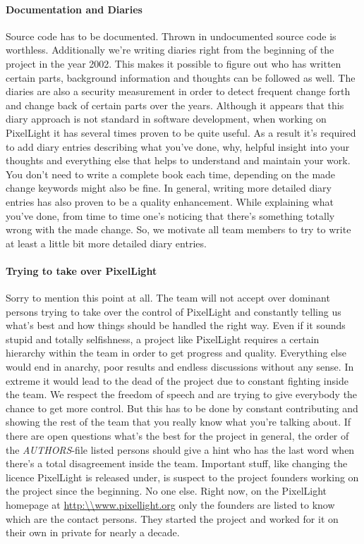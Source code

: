\paragraph{Documentation and Diaries}
Source code has to be documented. Thrown in undocumented source code is worthless. Additionally we're writing diaries right from the beginning of the project in the year 2002. This makes it possible to figure out who has written certain parts, background information and thoughts can be followed as well. The diaries are also a security measurement in order to detect frequent change forth and change back of certain parts over the years. Although it appears that this diary approach is not standard in software development, when working on PixelLight it has several times proven to be quite useful. As a result it's required to add diary entries describing what you've done, why, helpful insight into your thoughts and everything else that helps to understand and maintain your work. You don't need to write a complete book each time, depending on the made change keywords might also be fine. In general, writing more detailed diary entries has also proven to be a quality enhancement. While explaining what you've done, from time to time one's noticing that there's something totally wrong with the made change. So, we motivate all team members to try to write at least a little bit more detailed diary entries.


\paragraph{Trying to take over PixelLight}
Sorry to mention this point at all. The team will not accept over dominant persons trying to take over the control of PixelLight and constantly telling us what's best and how things should be handled the right way. Even if it sounds stupid and totally selfishness, a project like PixelLight requires a certain hierarchy within the team in order to get progress and quality. Everything else would end in anarchy, poor results and endless discussions without any sense. In extreme it would lead to the dead of the project due to constant fighting inside the team. We respect the freedom of speech and are trying to give everybody the chance to get more control. But this has to be done by constant contributing and showing the rest of the team that you really know what you're talking about. If there are open questions what's the best for the project in general, the order of the \emph{AUTHORS}-file listed persons should give a hint who has the last word when there's a total disagreement inside the team. Important stuff, like changing the licence PixelLight is released under, is suspect to the project founders working on the project since the beginning. No one else. Right now, on the PixelLight homepage at \url{http:\\www.pixellight.org} only the founders are listed to know which are the contact persons. They started the project and worked for it on their own in private for nearly a decade.




